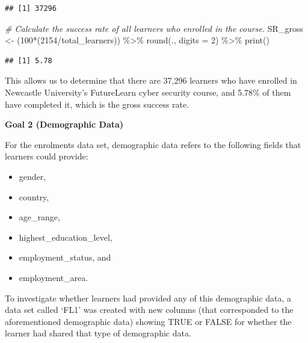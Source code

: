 \documentclass[
]{article}
\newenvironment{Shaded}{\begin{snugshade}}{\end{snugshade}}
\newcommand{\AttributeTok}[1]{\textcolor[rgb]{0.77,0.63,0.00}{#1}}
\newcommand{\CommentTok}[1]{\textcolor[rgb]{0.56,0.35,0.01}{\textit{#1}}}
\newcommand{\DecValTok}[1]{\textcolor[rgb]{0.00,0.00,0.81}{#1}}
\newcommand{\FunctionTok}[1]{\textcolor[rgb]{0.00,0.00,0.00}{#1}}
\newcommand{\NormalTok}[1]{#1}
\newcommand{\OtherTok}[1]{\textcolor[rgb]{0.56,0.35,0.01}{#1}}
\newcommand{\SpecialCharTok}[1]{\textcolor[rgb]{0.00,0.00,0.00}{#1}}
\begin{document}
\begin{verbatim}
## [1] 37296
\end{verbatim}

\begin{Shaded}
\begin{Highlighting}[]
\CommentTok{\# Calculate the success rate of all learners who enrolled in the course. }
\NormalTok{SR\_gross }\OtherTok{\textless{}{-}}\NormalTok{ (}\DecValTok{100}\SpecialCharTok{*}\NormalTok{(}\DecValTok{2154}\SpecialCharTok{/}\NormalTok{total\_learners)) }\SpecialCharTok{\%\textgreater{}\%} 
  \FunctionTok{round}\NormalTok{(., }\AttributeTok{digits =} \DecValTok{2}\NormalTok{) }\SpecialCharTok{\%\textgreater{}\%} 
  \FunctionTok{print}\NormalTok{()}
\end{Highlighting}
\end{Shaded}

\begin{verbatim}
## [1] 5.78
\end{verbatim}

This allows us to determine that there are 37,296 learners who have
enrolled in Newcastle University's FutureLearn cyber security course,
and 5.78\% of them have completed it, which is the gross success rate.

\textbf{Goal 2 (Demographic Data)}

For the enrolments data set, demographic data refers to the following
fields that learners could provide:

\begin{itemize}
\item
  gender,
\item
  country,
\item
  age\_range,
\item
  highest\_education\_level,
\item
  employment\_status, and
\item
  employment\_area.
\end{itemize}

To investigate whether learners had provided any of this demographic
data, a data set called `FL1' was created with new columns (that
corresponded to the aforementioned demographic data) showing TRUE or
FALSE for whether the learner had shared that type of demographic data.
\end{document}
